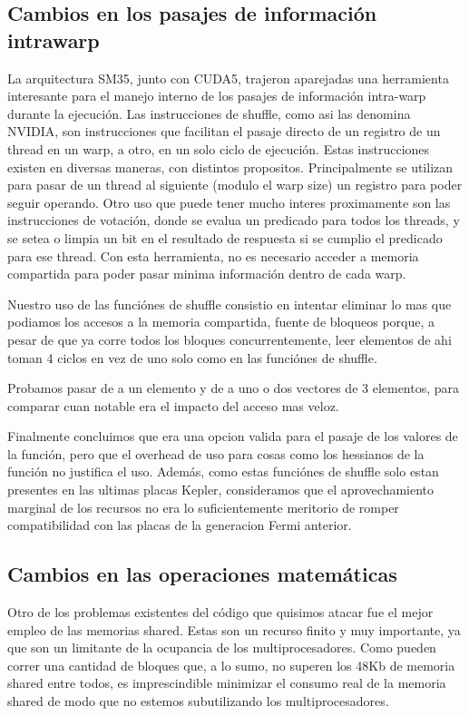 \subsection{Cambios en los pasajes de informaci\'on intrawarp}
La arquitectura SM35, junto con CUDA5, trajeron aparejadas una herramienta interesante
para el manejo interno de los pasajes de informaci\'on intra-warp durante la ejecuci\'on.
Las instrucciones de shuffle, como asi las denomina NVIDIA, son instrucciones que facilitan
el pasaje directo de un registro de un thread en un warp, a otro, en un solo ciclo de ejecuci\'on.
Estas instrucciones existen en diversas maneras, con distintos propositos. Principalmente se
utilizan para pasar de un thread al siguiente (modulo el warp size) un registro para poder seguir
operando. Otro uso que puede tener mucho interes proximamente son las instrucciones de votaci\'on,
donde se evalua un predicado para todos los threads, y se setea o limpia un bit en el resultado
de respuesta si se cumplio el predicado para ese thread. Con esta herramienta, no es necesario
acceder a memoria compartida para poder pasar minima informaci\'on dentro de cada warp.

Nuestro uso de las funci\'ones de shuffle consistio en intentar eliminar lo mas que podiamos
los accesos a la memoria compartida, fuente de bloqueos porque, a pesar de que ya corre
todos los bloques concurrentemente, leer elementos de ahi toman 4 ciclos en vez de uno solo
como en las funci\'ones de shuffle.

Probamos pasar de a un elemento y de a uno o dos vectores de 3 elementos, para comparar
cuan notable era el impacto del acceso mas veloz.

Finalmente concluimos que era una opcion valida para el pasaje de los valores de la funci\'on,
pero que el overhead de uso para cosas como los hessianos de la funci\'on no justifica el uso.
Adem\'as, como estas funci\'ones de shuffle solo estan presentes en las ultimas placas Kepler,
consideramos que el aprovechamiento marginal de los recursos no era lo suficientemente meritorio
de romper compatibilidad con las placas de la generacion Fermi anterior.






\subsection{Cambios en las operaciones matem\'aticas}
Otro de los problemas existentes del c\'odigo que quisimos atacar fue el mejor empleo de las
memorias shared. Estas son un recurso finito y muy importante, ya que son un limitante de
la ocupancia de los multiprocesadores. Como pueden correr una cantidad de bloques que, a lo sumo,
no superen los 48Kb de memoria shared entre todos, es imprescindible minimizar el consumo real
de la memoria shared de modo que no estemos subutilizando los multiprocesadores.

